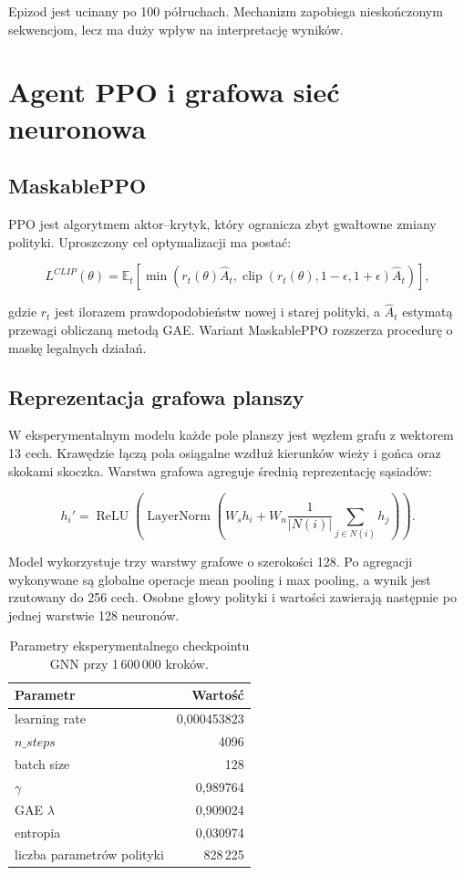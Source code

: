 \documentclass[12pt,a4paper]{article}
\begin{document}
Epizod jest ucinany po 100 półruchach. Mechanizm zapobiega nieskończonym
sekwencjom, lecz ma duży wpływ na interpretację wyników.

\section{Agent PPO i grafowa sieć neuronowa}

\subsection{MaskablePPO}

PPO jest algorytmem aktor--krytyk, który ogranicza zbyt gwałtowne zmiany polityki.
Uproszczony cel optymalizacji ma postać:

\[
L^{CLIP}(\theta)=
\mathbb{E}_t\left[
\min\left(
r_t(\theta)\hat A_t,
\operatorname{clip}(r_t(\theta),1-\epsilon,1+\epsilon)\hat A_t
\right)\right],
\]

gdzie $r_t$ jest ilorazem prawdopodobieństw nowej i starej polityki, a
$\hat A_t$ estymatą przewagi obliczaną metodą GAE. Wariant MaskablePPO rozszerza
procedurę o maskę legalnych działań.

\subsection{Reprezentacja grafowa planszy}

W eksperymentalnym modelu każde pole planszy jest węzłem grafu z wektorem
13 cech. Krawędzie łączą pola osiągalne wzdłuż kierunków wieży i gońca oraz
skokami skoczka. Warstwa grafowa agreguje średnią reprezentację sąsiadów:

\[
h_i'=\operatorname{ReLU}\left(
\operatorname{LayerNorm}\left(
W_s h_i + W_n\frac{1}{|N(i)|}\sum_{j\in N(i)}h_j
\right)\right).
\]

Model wykorzystuje trzy warstwy grafowe o szerokości 128. Po agregacji
wykonywane są globalne operacje mean pooling i max pooling, a wynik jest
rzutowany do 256 cech. Osobne głowy polityki i wartości zawierają następnie po
jednej warstwie 128 neuronów.

\begin{table}[H]
\centering
\caption{Parametry eksperymentalnego checkpointu GNN przy 1\,600\,000 kroków.}
\begin{tabular}{lr}
\toprule
\textbf{Parametr} & \textbf{Wartość} \\
\midrule
learning rate & 0,000453823 \\
$n\_steps$ & 4096 \\
batch size & 128 \\
$\gamma$ & 0,989764 \\
GAE $\lambda$ & 0,909024 \\
entropia & 0,030974 \\
liczba parametrów polityki & 828\,225 \\
\bottomrule
\end{tabular}
\end{table}
\end{document}
